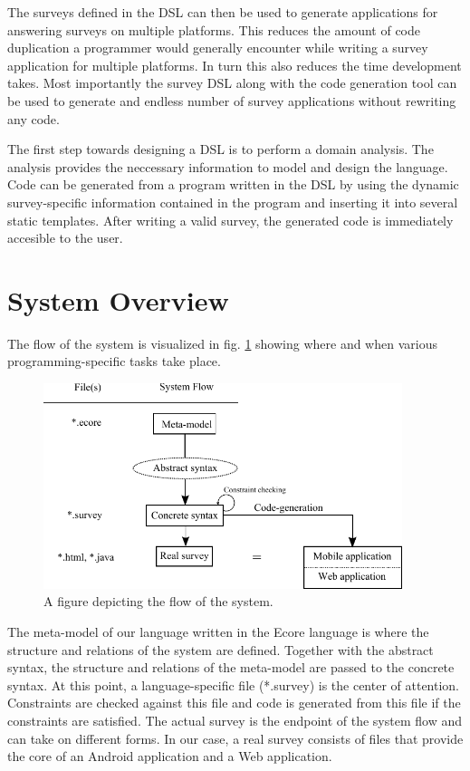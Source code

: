 \documentclass[runningheads]{llncs}
\begin{document}
The surveys defined in the DSL can then be used to generate applications for answering surveys on multiple platforms. This reduces the amount of code duplication a programmer would generally encounter while writing a survey application for multiple platforms. In turn this also reduces the time development takes. Most importantly the survey DSL along with the code generation tool can be used to generate and endless number of survey applications without rewriting any code. 

The first step towards designing a DSL is to perform a domain analysis. The analysis provides the neccessary information to model and design the language. Code can be generated from a program written in the DSL by using the dynamic survey-specific information contained in the program and inserting it into several static templates. After writing a valid survey, the generated code is immediately accesible to the user. 

\section{System Overview}
The flow of the system is visualized in fig. \ref{fig:flow} showing where and when various programming-specific tasks take place.
\begin{figure}
\centering
\includegraphics[height=6cm]{systemflow}
\caption{A figure depicting the flow of the system.}
\label{fig:flow}
\end{figure}
The meta-model of our language written in the Ecore language is where the structure and relations of the system are defined. Together with the abstract syntax, the structure and relations of the meta-model are passed to the concrete syntax. At this point, a language-specific file (*.survey) is the center of attention. Constraints are checked against this file and code is generated from this file if the constraints are satisfied. The actual survey is the endpoint of the system flow and can take on different forms. In our case, a real survey consists of files that provide the core of an Android application and a Web application. 
\end{document}
